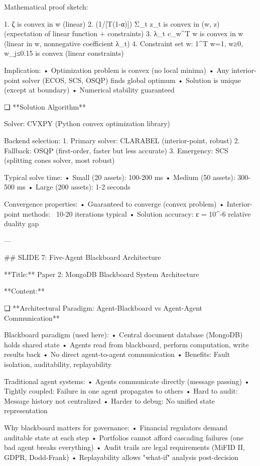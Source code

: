 Mathematical proof sketch:

1. ζ is convex in w (linear)
2. (1/[T(1-α)]) Σ_t z_t is convex in (w, z) (expectation of linear function + constraints)
3. λ_t c_w^T w is convex in w (linear in w, nonnegative coefficient λ_t)
4. Constraint set {w: 1^T w=1, w≥0, w_j≤0.15} is convex (linear constraints)

Implication:
   • Optimization problem is convex (no local minima)
   • Any interior-point solver (ECOS, SCS, OSQP) finds global optimum
   • Solution is unique (except at boundary)
   • Numerical stability guaranteed

❑ **Solution Algorithm**

Solver: CVXPY (Python convex optimization library)

Backend selection:
   1. Primary solver: CLARABEL (interior-point, robust)
   2. Fallback: OSQP (first-order, faster but less accurate)
   3. Emergency: SCS (splitting cones solver, most robust)

Typical solve time:
   • Small (20 assets): 100-200 ms
   • Medium (50 assets): 300-500 ms
   • Large (200 assets): 1-2 seconds

Convergence properties:
   • Guaranteed to converge (convex problem)
   • Interior-point methods: ~10-20 iterations typical
   • Solution accuracy: ε = 10^{-6} relative duality gap

---

## SLIDE 7: Five-Agent Blackboard Architecture

**Title:** Paper 2: MongoDB Blackboard System Architecture

**Content:**

❑ **Architectural Paradigm: Agent-Blackboard vs Agent-Agent Communication**

Blackboard paradigm (used here):
   • Central document database (MongoDB) holds shared state
   • Agents read from blackboard, perform computation, write results back
   • No direct agent-to-agent communication
   • Benefits: Fault isolation, auditability, replayability

Traditional agent systems:
   • Agents communicate directly (message passing)
   • Tightly coupled: Failure in one agent propagates to others
   • Hard to audit: Message history not centralized
   • Harder to debug: No unified state representation

Why blackboard matters for governance:
   • Financial regulators demand auditable state at each step
   • Portfolios cannot afford cascading failures (one bad agent breaks everything)
   • Audit trails are legal requirements (MiFID II, GDPR, Dodd-Frank)
   • Replayability allows "what-if" analysis post-decision

